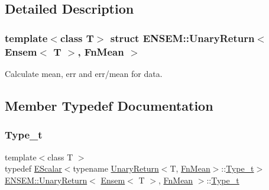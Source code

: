 \subsection{Detailed Description}
\subsubsection*{template$<$class T$>$\newline
struct E\+N\+S\+E\+M\+::\+Unary\+Return$<$ Ensem$<$ T $>$, Fn\+Mean $>$}

Calculate mean, err and err/mean for data. 

\subsection{Member Typedef Documentation}
\mbox{\label{structENSEM_1_1UnaryReturn_3_01Ensem_3_01T_01_4_00_01FnMean_01_4_aecb00ba039f774eb3f7e9c0d788867a6}} 
\subsubsection{\texorpdfstring{Type\_t}{Type\_t}\hspace{0.1cm}{\footnotesize\ttfamily [1/3]}}
{\footnotesize\ttfamily template$<$class T $>$ \\
typedef \mbox{\hyperlink{classENSEM_1_1EScalar}{E\+Scalar}}$<$typename \mbox{\hyperlink{structENSEM_1_1UnaryReturn}{Unary\+Return}}$<$T, \mbox{\hyperlink{structENSEM_1_1FnMean}{Fn\+Mean}}$>$\+::\mbox{\hyperlink{structENSEM_1_1UnaryReturn_3_01Ensem_3_01T_01_4_00_01FnMean_01_4_aecb00ba039f774eb3f7e9c0d788867a6}{Type\+\_\+t}}$>$ \mbox{\hyperlink{structENSEM_1_1UnaryReturn}{E\+N\+S\+E\+M\+::\+Unary\+Return}}$<$ \mbox{\hyperlink{classENSEM_1_1Ensem}{Ensem}}$<$ T $>$, \mbox{\hyperlink{structENSEM_1_1FnMean}{Fn\+Mean}} $>$\+::\mbox{\hyperlink{structENSEM_1_1UnaryReturn_3_01Ensem_3_01T_01_4_00_01FnMean_01_4_aecb00ba039f774eb3f7e9c0d788867a6}{Type\+\_\+t}}}

\mbox{\label{structENSEM_1_1UnaryReturn_3_01Ensem_3_01T_01_4_00_01FnMean_01_4_aecb00ba039f774eb3f7e9c0d788867a6}} 
